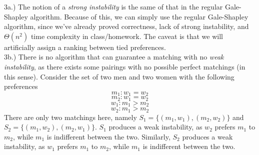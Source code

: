 \documentclass[12pt]{article}
\begin{document}
\pagebreak

3a.) The notion of a \emph{strong instability} is the same of that in the regular Gale-Shapley algorithm. Because of this, we can simply use the regular Gale-Shapley algorithm, since we've already proved correctness, lack of strong instability, and $\Theta(n^2)$ time complexity in class/homework. The caveat is that we will artificially assign a ranking between tied preferences. \\

3b.) There is no algorithm that can guarantee a matching with no \emph{weak instability}, as there exists some pairings with no possible perfect matchings (in this sense). Consider the set of two men and two women with the following preferences
$$m_1: w_1 = w_2$$
$$m_2: w_1 = w_2$$
$$w_1: m_1 > m_2$$
$$w_2: m_1 > m_2$$
There are only two matchings here, namely $S_1 = \{ (m_1, w_1) , (m_2, w_2) \}$ and $S_2 =  \{ (m_1, w_2), (m_2, w_1) \}$. $S_1$ produces a weak instability, as $w_2$ prefers $m_1$ to $m_2$, while $m_1$ is indifferent between the two. Similarly, $S_2$ produces a weak instability, as $w_1$ prefers $m_1$ to $m_2$, while $m_1$ is indifferent between the two.
\end{document}
